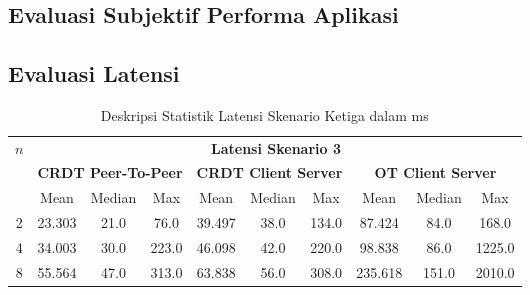 \chapter{\babLima}
\label{bab:5}

\section{Evaluasi Subjektif Performa Aplikasi}


\section{Evaluasi Latensi}

\begin{table}[H]
 \centering
 \caption{Deskripsi Statistik Latensi Skenario Ketiga dalam ms}
\begin{tabular}{|c|ccccccccc|}
\hline
\multirow{3}{*}{\textbf{$n$}} & \multicolumn{9}{c|}{\textbf{Latensi Skenario 3}} \\ \cline{2-10}
 & \multicolumn{3}{c|}{\textbf{CRDT Peer-To-Peer}} & \multicolumn{3}{c|}{\textbf{CRDT Client Server}} & \multicolumn{3}{c|}{\textbf{OT Client Server}} \\ \cline{2-10}
 & \multicolumn{1}{c|}{Mean} & \multicolumn{1}{c|}{Median} & \multicolumn{1}{c|}{Max} & \multicolumn{1}{c|}{Mean} & \multicolumn{1}{c|}{Median} & \multicolumn{1}{c|}{Max} & \multicolumn{1}{c|}{Mean} & \multicolumn{1}{c|}{Median} & Max \\ \hline
2 & \multicolumn{1}{c|}{23.303} & \multicolumn{1}{c|}{21.0} & \multicolumn{1}{c|}{76.0} & \multicolumn{1}{c|}{39.497} & \multicolumn{1}{c|}{38.0} & \multicolumn{1}{c|}{134.0} & \multicolumn{1}{c|}{87.424} & \multicolumn{1}{c|}{84.0} & 168.0 \\ \hline
4 & \multicolumn{1}{c|}{34.003} & \multicolumn{1}{c|}{30.0} & \multicolumn{1}{c|}{223.0} & \multicolumn{1}{c|}{46.098} & \multicolumn{1}{c|}{42.0} & \multicolumn{1}{c|}{220.0} & \multicolumn{1}{c|}{98.838} & \multicolumn{1}{c|}{86.0} & 1225.0 \\ \hline
8 & \multicolumn{1}{c|}{55.564} & \multicolumn{1}{c|}{47.0} & \multicolumn{1}{c|}{313.0} & \multicolumn{1}{c|}{63.838} & \multicolumn{1}{c|}{56.0} & \multicolumn{1}{c|}{308.0} & \multicolumn{1}{c|}{235.618} & \multicolumn{1}{c|}{151.0} & 2010.0 \\ \hline
\end{tabular}
\end{table}

